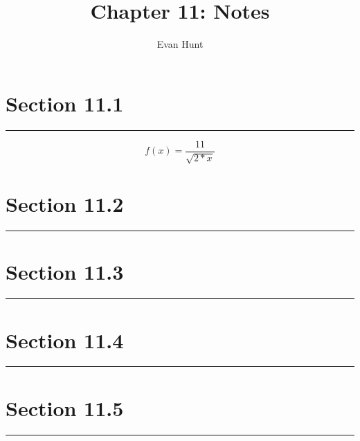 \documentclass[12pt]{article}
\title{Chapter 11: Notes}
\author{Evan Hunt}
\begin{document}
    \maketitle

    \section[]{Section 11.1}
    \noindent\rule{\textwidth}{0.4pt}
        \begin{equation}
            f(x) = \frac{11}{\sqrt{2*x}}
        \end{equation}
    \section[]{Section 11.2}
    \noindent\rule{\textwidth}{0.4pt}
    \section[]{Section 11.3}
    \noindent\rule{\textwidth}{0.4pt}
    \section[]{Section 11.4}
    \noindent\rule{\textwidth}{0.4pt}
    \section[]{Section 11.5}
    \noindent\rule{\textwidth}{0.4pt}
\end{document}
